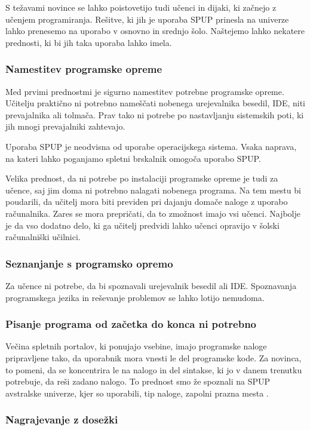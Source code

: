 S težavami novince se lahko poistovetijo tudi učenci in dijaki, ki začnejo z
učenjem programiranja. Rešitve, ki jih je uporaba SPUP prinesla na
univerze lahko prenesemo na uporabo v osnovno in srednjo
šolo. Naštejemo lahko nekatere prednosti, ki bi jih taka uporaba lahko
imela.

\subsubsection{Namestitev programske opreme}
\label{sec:Namestitev_programske_opreme}

Med prvimi prednostmi je sigurno namestitev potrebne programske
opreme. Učitelju praktično ni potrebno nameščati nobenega urejevalnika
besedil, IDE, niti prevajalnika ali tolmača. Prav tako ni potrebe po
nastavljanju sistemskih poti, ki jih mnogi prevajalniki zahtevajo.

Uporaba SPUP je neodvisna od uporabe operacijskega sistema. Vsaka
naprava, na kateri lahko poganjamo spletni brskalnik omogoča uporabo
SPUP.

Velika prednost, da ni potrebe po instalaciji programske opreme je
tudi za učence, saj jim doma ni potrebno nalagati nobenega
programa. Na tem mestu bi poudarili, da učitelj mora biti previden pri
dajanju domače naloge z uporabo računalnika. Zares se mora prepričati,
da to zmožnost imajo vsi učenci. Najbolje je da vso dodatno delo, ki
ga učitelj predvidi lahko učenci opravijo v šolski računalniški
učilnici.

\subsubsection{Seznanjanje s programsko opremo}
\label{sec:Seznanjanje_s_prog_opremo}

Za učence ni potrebe, da bi spoznavali urejevalnik besedil ali
IDE. Spoznavanja programskega jezika in reševanje problemov se lahko
lotijo nemudoma.


\subsubsection{Pisanje programa od začetka do konca ni potrebno}
\label{sec:pisanj_celega_progama}

Večina spletnih portalov, ki ponujajo vsebine, imajo programske naloge
pripravljene tako, da uporabnik mora vnesti le del programske kode. Za
novinca, to pomeni, da se koncentrira le na nalogo in del sintakse, ki
jo v danem trenutku potrebuje, da reši zadano nalogo. To prednost smo
že spoznali na SPUP avstralske univerze, kjer so uporabili, tip
naloge, zapolni prazna mesta \cite{thesisAWebP}.

\subsubsection{Nagrajevanje z dosežki}
\label{sec:nagrajevanje_s_dosežkov}



